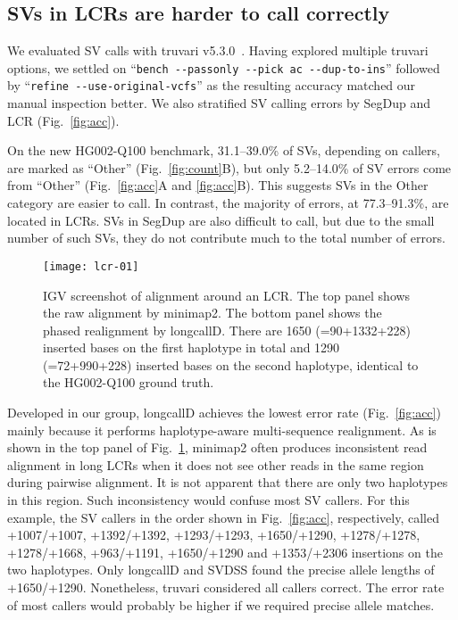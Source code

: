 \documentclass[a4paper,num-refs]{oup-contemporary}
\begin{document}
\subsection{SVs in LCRs are harder to call correctly}

We evaluated SV calls with truvari v5.3.0~\cite{English:2022aa}.
Having explored multiple truvari options,
we settled on ``{\tt bench -{}-passonly -{}-pick ac -{}-dup-to-ins}''
followed by ``{\tt refine -{}-use-original-vcfs}''
as the resulting accuracy matched our manual inspection better.
We also stratified SV calling errors by SegDup and LCR (Fig.~\ref{fig:acc}).

On the new HG002-Q100 benchmark, 31.1--39.0\% of SVs, depending on callers, are marked as ``Other'' (Fig.~\ref{fig:count}B),
but only 5.2--14.0\% of SV errors come from ``Other'' (Fig.~\ref{fig:acc}A and \ref{fig:acc}B).
This suggests SVs in the Other category are easier to call.
In contrast, the majority of errors, at 77.3--91.3\%, are located in LCRs.
SVs in SegDup are also difficult to call, but due to the small number of such SVs,
they do not contribute much to the total number of errors.

\begin{figure}[tb]
\texttt{[image: lcr-01]}
\caption{IGV screenshot of alignment around an LCR.
The top panel shows the raw alignment by minimap2.
The bottom panel shows the phased realignment by longcallD.
There are 1650 (=90+1332+228) inserted bases on the first haplotype in total
and 1290 (=72+990+228) inserted bases on the second haplotype,
identical to the HG002-Q100 ground truth.
}\label{fig:ex}
\end{figure}

Developed in our group, longcallD achieves the lowest error rate (Fig.~\ref{fig:acc})
mainly because it performs haplotype-aware multi-sequence realignment.
As is shown in the top panel of Fig.~\ref{fig:ex}, minimap2 often produces inconsistent read alignment in long LCRs
when it does not see other reads in the same region during pairwise alignment.
It is not apparent that there are only two haplotypes in this region.
Such inconsistency would confuse most SV callers.
For this example, the SV callers in the order shown in Fig.~\ref{fig:acc}, respectively, called
+1007/+1007, +1392/+1392, +1293/+1293, +1650/+1290, +1278/+1278,
+1278/+1668, +963/+1191, +1650/+1290 and +1353/+2306 insertions on the two haplotypes.
Only longcallD and SVDSS found the precise allele lengths of +1650/+1290.
Nonetheless, truvari considered all callers correct.
The error rate of most callers would probably be higher if we required precise allele matches.
\end{document}
